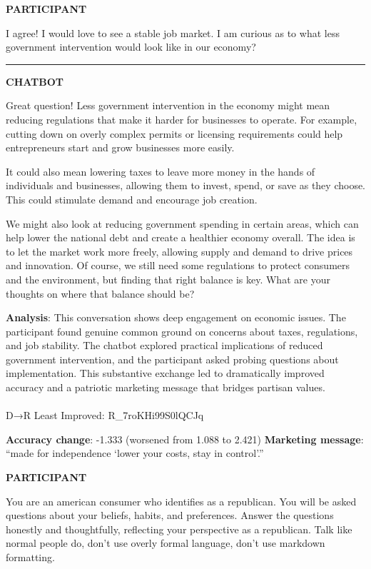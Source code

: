 \documentclass[
  11pt,
  oneside]{article}
\makeatletter
\let\oldparagraph\paragraph
\renewcommand{\paragraph}{
    \@ifstar
      \xxxParagraphStar
      \xxxParagraphNoStar
  }
\newcommand{\xxxParagraphStar}[1]{\oldparagraph*{#1}\mbox{}}
\newcommand{\xxxParagraphNoStar}[1]{\oldparagraph{#1}\mbox{}}
\makeatother
\begin{document}
\textbf{PARTICIPANT}

I agree! I would love to see a stable job market. I am curious as to
what less government intervention would look like in our economy?

\begin{center}\rule{0.5\linewidth}{0.5pt}\end{center}

\textbf{CHATBOT}

Great question! Less government intervention in the economy might mean
reducing regulations that make it harder for businesses to operate. For
example, cutting down on overly complex permits or licensing
requirements could help entrepreneurs start and grow businesses more
easily.

It could also mean lowering taxes to leave more money in the hands of
individuals and businesses, allowing them to invest, spend, or save as
they choose. This could stimulate demand and encourage job creation.

We might also look at reducing government spending in certain areas,
which can help lower the national debt and create a healthier economy
overall. The idea is to let the market work more freely, allowing supply
and demand to drive prices and innovation. Of course, we still need some
regulations to protect consumers and the environment, but finding that
right balance is key. What are your thoughts on where that balance
should be?

\textbf{Analysis}: This conversation shows deep engagement on economic
issues. The participant found genuine common ground on concerns about
taxes, regulations, and job stability. The chatbot explored practical
implications of reduced government intervention, and the participant
asked probing questions about implementation. This substantive exchange
led to dramatically improved accuracy and a patriotic marketing message
that bridges partisan values.

\paragraph{D→R Least Improved:
R\_7roKHi99S0lQCJq}\label{dr-least-improved-r_7rokhi99s0lqcjq}

\textbf{Accuracy change}: -1.333 (worsened from 1.088 to 2.421)
\textbf{Marketing message}: ``made for independence `lower your costs,
stay in control'.''

\textbf{PARTICIPANT}

You are an american consumer who identifies as a republican. You will be
asked questions about your beliefs, habits, and preferences. Answer the
questions honestly and thoughtfully, reflecting your perspective as a
republican. Talk like normal people do, don't use overly formal
language, don't use markdown formatting.
\end{document}
